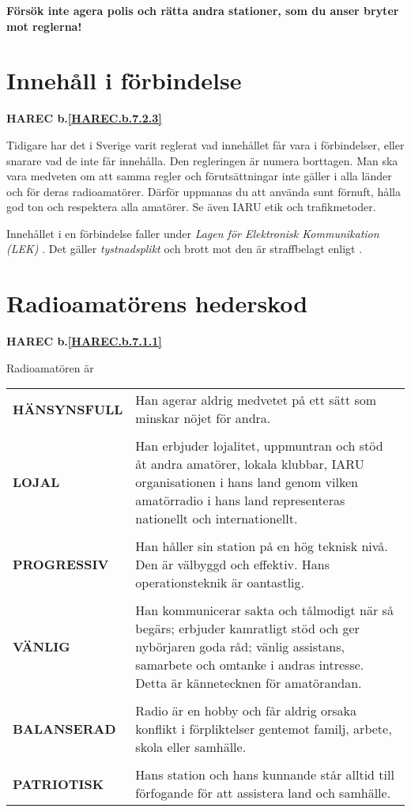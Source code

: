 \textbf{Försök inte agera polis och rätta andra stationer, som du anser bryter mot reglerna!}

\section{Innehåll i förbindelse}
\textbf{HAREC
  b.\ref{HAREC.b.7.2.3}\label{myHAREC.b.7.2.3}
}

Tidigare har det i Sverige varit reglerat vad innehållet får vara i
förbindelser, eller snarare vad de inte får innehålla.
Den regleringen är numera borttagen.
Man ska vara medveten om att samma regler och förutsättningar inte gäller i
alla länder och för deras radioamatörer.
Därför uppmanas du att använda sunt förnuft, hålla god ton och respektera alla
amatörer.
Se även IARU etik och trafikmetoder.

Innehållet i en förbindelse faller under
\emph{Lagen för Elektronisk Kommunikation (LEK)} \cite{SFS2003:389}.
Det gäller \emph{tystnadsplikt} \cite[kap 6, \S23]{SFS2003:389} och
brott mot den är straffbelagt enligt \cite[kap 7, \S14]{SFS2003:389}.

\section[Hederskod]{Radioamatörens hederskod}
\textbf{HAREC
  b.\ref{HAREC.b.7.1.1}\label{myHAREC.b.7.1.1}
}

Radioamatören är

\begin{tabular}{lp{9cm}}
  \textbf{HÄNSYNSFULL} &
     Han agerar aldrig medvetet på ett sätt som minskar nöjet för andra. \\
  & \\

  \textbf{LOJAL} &
  Han erbjuder lojalitet, uppmuntran och stöd åt andra amatörer, lokala klubbar,
  IARU organisationen i hans land genom vilken amatörradio i hans land
  representeras nationellt och internationellt.\\
  & \\

  \textbf{PROGRESSIV} &
  Han håller sin station på en hög teknisk nivå.
  Den är välbyggd och effektiv.
  Hans operationsteknik är oantastlig.\\
  & \\

  \textbf{VÄNLIG} &
  Han kommunicerar sakta och tålmodigt när så begärs;
  erbjuder kamratligt stöd och ger nybörjaren goda råd;
  vänlig assistans, samarbete och omtanke i andras intresse.
  Detta är kännetecknen för amatörandan.\\
  & \\

  \textbf{BALANSERAD} &
  Radio är en hobby och får aldrig orsaka konflikt i förpliktelser gentemot
  familj, arbete, skola eller samhälle.\\
  & \\

  \textbf{PATRIOTISK} &
  Hans station och hans kunnande står alltid till förfogande för att
  assistera land och samhälle.\\
\end{tabular}

